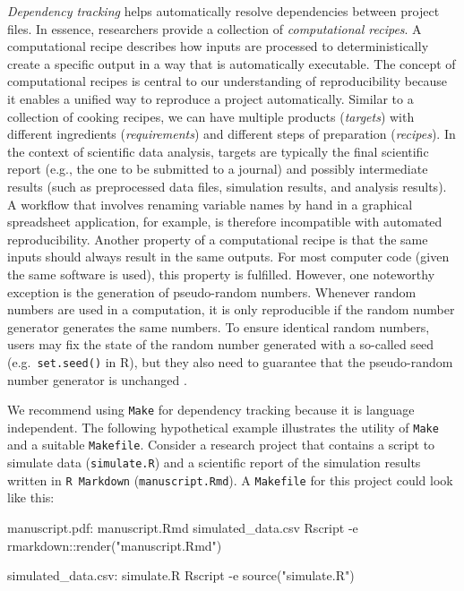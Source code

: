 \documentclass[psych,tutorial,submit,moreauthors,pdftex]{mdpi}
\newenvironment{Shaded}{\begin{snugshade}}{\end{snugshade}}
\newcommand{\AttributeTok}[1]{\textcolor[rgb]{0.77,0.63,0.00}{#1}}
\newcommand{\ExtensionTok}[1]{#1}
\newcommand{\NormalTok}[1]{#1}
\newcommand{\StringTok}[1]{\textcolor[rgb]{0.31,0.60,0.02}{#1}}
\begin{document}
\emph{Dependency tracking} helps automatically resolve dependencies
between project files. In essence, researchers provide a collection of
\emph{computational recipes}. A computational recipe describes how
inputs are processed to deterministically create a specific output in a
way that is automatically executable. The concept of computational
recipes is central to our understanding of reproducibility because it
enables a unified way to reproduce a project automatically. Similar to a
collection of cooking recipes, we can have multiple products
(\emph{targets}) with different ingredients (\emph{requirements}) and
different steps of preparation (\emph{recipes}). In the context of
scientific data analysis, targets are typically the final scientific
report (e.g., the one to be submitted to a journal) and possibly
intermediate results (such as preprocessed data files, simulation
results, and analysis results). A workflow that involves renaming
variable names by hand in a graphical spreadsheet application, for
example, is therefore incompatible with automated reproducibility.
Another property of a computational recipe is that the same inputs
should always result in the same outputs. For most computer code (given
the same software is used), this property is fulfilled. However, one
noteworthy exception is the generation of pseudo-random numbers.
Whenever random numbers are used in a computation, it is only
reproducible if the random number generator generates the same numbers.
To ensure identical random numbers, users may fix the state of the
random number generated with a so-called seed (e.g.~\texttt{set.seed()}
in R), but they also need to guarantee that the pseudo-random number
generator is unchanged \citep[see][]{Peikert2019}.

We recommend using \texttt{Make} for dependency tracking because it is
language independent. The following hypothetical example illustrates the
utility of \texttt{Make} and a suitable \texttt{Makefile}. Consider a
research project that contains a script to simulate data
(\texttt{simulate.R}) and a scientific report of the simulation results
written in \texttt{R\ Markdown} (\texttt{manuscript.Rmd}). A
\texttt{Makefile} for this project could look like this:

\begin{Shaded}
\begin{Highlighting}[]
\ExtensionTok{manuscript.pdf:}\NormalTok{ manuscript.Rmd simulated\_data.csv}
  \ExtensionTok{Rscript} \AttributeTok{{-}e} \StringTok{\textquotesingle{}rmarkdown::render("manuscript.Rmd")\textquotesingle{}}

\ExtensionTok{simulated\_data.csv:}\NormalTok{ simulate.R}
  \ExtensionTok{Rscript} \AttributeTok{{-}e} \StringTok{\textquotesingle{}source("simulate.R")\textquotesingle{}}
\end{Highlighting}
\end{Shaded}
\end{document}
